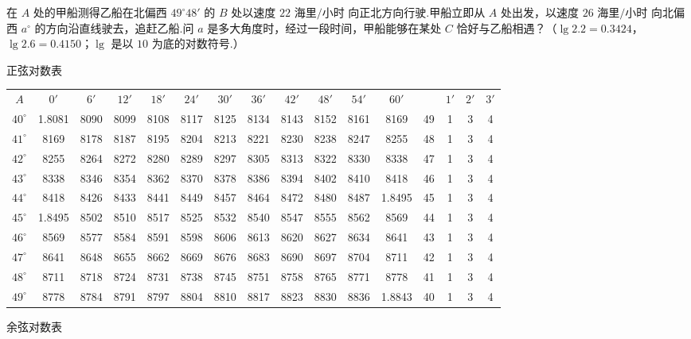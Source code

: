 \begin{problem}
在 \(A\) 处的甲船测得乙船在北偏西 \(49^\circ48'\) 的 \(B\) 处以速度 \(22\text{ 海里/小时}\) 向正北方向行驶.甲船立即从 \(A\) 处出发，以速度 \(26\text{ 海里/小时}\) 向北偏西 \(a^\circ\) 的方向沿直线驶去，追赶乙船.问 \(a\) 是多大角度时，经过一段时间，甲船能够在某处 \(C\) 恰好与乙船相遇？（\(\lg 2.2=0.3424\)，\(\lg 2.6=0.4150\)；\(\lg\) 是以 \(10\) 为底的对数符号.）

\begin{center}
\begin{minipage}{\linewidth}
\centering
\scriptsize
\setlength{\tabcolsep}{2.2pt}
正弦对数表

\begin{tabular}{c|ccccccccccc|c|ccc}
\hline
\(A\) & \( 0' \) & \( 6' \) & \( 12' \) & \( 18' \) & \( 24' \) & \( 30' \) & \( 36' \) & \( 42' \) & \( 48' \) & \( 54' \) & \( 60' \) &  & \( 1' \) & \( 2' \) & \( 3' \) \\
\( 40^\circ \) & 1.8081 & 8090 & 8099 & 8108 & 8117 & 8125 & 8134 & 8143 & 8152 & 8161 & 8169 & 49 & 1 & 3 & 4 \\
\( 41^\circ \) & 8169 & 8178 & 8187 & 8195 & 8204 & 8213 & 8221 & 8230 & 8238 & 8247 & 8255 & 48 & 1 & 3 & 4 \\
\( 42^\circ \) & 8255 & 8264 & 8272 & 8280 & 8289 & 8297 & 8305 & 8313 & 8322 & 8330 & 8338 & 47 & 1 & 3 & 4 \\
\( 43^\circ \) & 8338 & 8346 & 8354 & 8362 & 8370 & 8378 & 8386 & 8394 & 8402 & 8410 & 8418 & 46 & 1 & 3 & 4 \\
\( 44^\circ \) & 8418 & 8426 & 8433 & 8441 & 8449 & 8457 & 8464 & 8472 & 8480 & 8487 & 1.8495 & 45 & 1 & 3 & 4 \\
\( 45^\circ \) & 1.8495 & 8502 & 8510 & 8517 & 8525 & 8532 & 8540 & 8547 & 8555 & 8562 & 8569 & 44 & 1 & 3 & 4 \\
\( 46^\circ \) & 8569 & 8577 & 8584 & 8591 & 8598 & 8606 & 8613 & 8620 & 8627 & 8634 & 8641 & 43 & 1 & 3 & 4 \\
\( 47^\circ \) & 8641 & 8648 & 8655 & 8662 & 8669 & 8676 & 8683 & 8690 & 8697 & 8704 & 8711 & 42 & 1 & 3 & 4 \\
\( 48^\circ \) & 8711 & 8718 & 8724 & 8731 & 8738 & 8745 & 8751 & 8758 & 8765 & 8771 & 8778 & 41 & 1 & 3 & 4 \\
\( 49^\circ \) & 8778 & 8784 & 8791 & 8797 & 8804 & 8810 & 8817 & 8823 & 8830 & 8836 & 1.8843 & 40 & 1 & 3 & 4 \\
\hline
\end{tabular}

余弦对数表
\end{minipage}
\end{center}

\end{problem}

